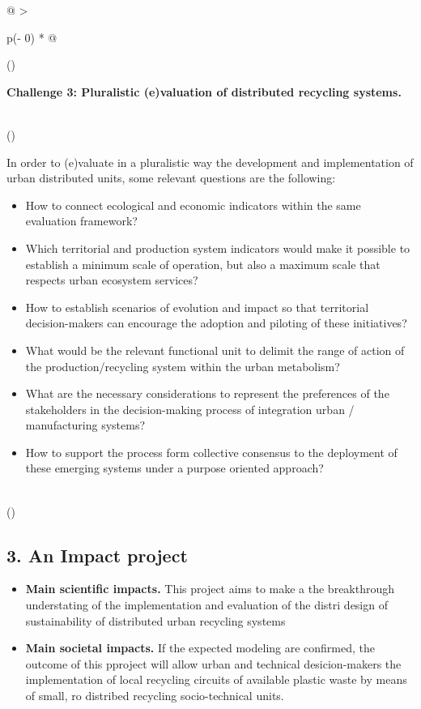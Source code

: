\documentclass[
  12pt,
  a4paperpaper,
  onecolumn]{article}
\begin{document}
\begin{longtable}[]{@{}
  >{\raggedright\arraybackslash}p{(\columnwidth - 0\tabcolsep) * }@{}}
\toprule()
\begin{minipage}[b]{\linewidth}\raggedright
\textbf{Challenge 3: Pluralistic (e)valuation of distributed recycling
systems.}
\end{minipage} \\
\midrule()
\endhead
\begin{minipage}[t]{\linewidth}\raggedright
In order to (e)valuate in a pluralistic way the development and
implementation of urban distributed units, some relevant questions are
the following:

\begin{itemize}
\item
  How to connect ecological and economic indicators within the same
  evaluation framework?
\item
  Which territorial and production system indicators would make it
  possible to establish a minimum scale of operation, but also a maximum
  scale that respects urban ecosystem services?
\item
  How to establish scenarios of evolution and impact so that territorial
  decision-makers can encourage the adoption and piloting of these
  initiatives?
\item
  What would be the relevant functional unit to delimit the range of
  action of the production/recycling system within the urban metabolism?
\item
  What are the necessary considerations to represent the preferences of
  the stakeholders in the decision-making process of integration urban /
  manufacturing systems?
\item
  How to support the process form collective consensus to the deployment
  of these emerging systems under a purpose oriented approach?
\end{itemize}
\end{minipage} \\
\bottomrule()
\end{longtable}

\normalsize

\hypertarget{an-impact-project}{%
\subsection{3. An Impact project}\label{an-impact-project}}

\begin{itemize}
\item
  \textbf{Main scientific impacts.} This project aims to make a the
  breakthrough understating of the implementation and evaluation of the
  distri design of sustainability of distributed urban recycling systems
\item
  \textbf{Main societal impacts.} If the expected modeling are
  confirmed, the outcome of this pproject will allow urban and technical
  desicion-makers the implementation of local recycling circuits of
  available plastic waste by means of small, ro distribed recycling
  socio-technical units.
\end{itemize}
\end{document}
